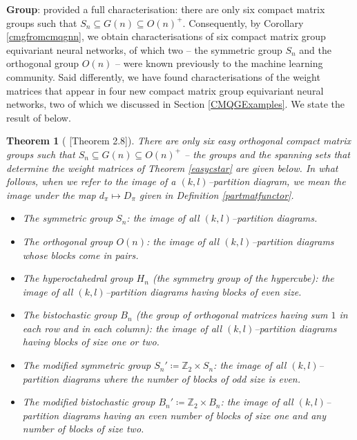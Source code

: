 \documentclass{article}
\theoremstyle{plain}
\newtheorem{theorem}{Theorem}[section]
\theoremstyle{definition}
\theoremstyle{remark}
\begin{document}
\textbf{Group}: 
\citet{banica}
provided a full characterisation: 
there are only six compact matrix groups
such that $S_n \subseteq G(n) \subseteq O(n)^{+}$. 
Consequently, by Corollary \ref{cmgfromcmqgnn},
we obtain characterisations of six compact matrix group equivariant neural networks, of which two -- the symmetric group $S_n$
\citep{ravanbakhsh17a, maron2018, pearcecrump, godfrey}
and the orthogonal group $O(n)$
\citep{pearcecrumpB}
-- 
were known previously to the machine learning community.
Said differently, we have found characterisations of the weight matrices 
that appear in four new compact matrix group equivariant neural networks,
two of which we discussed in Section \ref{CMQGExamples}.
We state the result of \citet{banica} below.

\begin{theorem}[\citet{banica} {[Theorem 2.8]}]
	\label{sixeasyorthog}
There are only six easy orthogonal compact matrix groups 
	such that $S_n \subseteq G(n) \subseteq O(n)^{+}$
	-- 
the groups and the spanning sets that determine the weight matrices of 
Theorem \ref{easycstar}
are given below. In what follows, when we refer to the image of a $(k,l)$--partition diagram, we mean the image under the map $d_\pi \mapsto D_\pi$ given in Definition
\ref{partmatfunctor}.

	\begin{itemize}
\item The symmetric group $S_n$: the image of all $(k,l)$--partition diagrams.

\item The orthogonal group $O(n)$: the image of all $(k,l)$--partition diagrams whose blocks come in pairs.

	\item The hyperoctahedral group $H_n$ (the symmetry group of the hypercube): the image of all $(k,l)$--partition diagrams having blocks of even size.

	\item The bistochastic group $B_n$ (the group of orthogonal matrices having sum $1$ in each row and in each column): the image of all $(k,l)$--partition diagrams having blocks of size one or two.

	\item The modified symmetric group $S_n' \coloneqq \mathbb{Z}_2 \times S_n$: the image of all $(k,l)$--partition diagrams where the number of blocks of odd size is even.

	\item The modified bistochastic group $B_n' \coloneqq \mathbb{Z}_2 \times B_n$: the image of all $(k,l)$--partition diagrams having an even number of blocks of size one and any number of blocks of size two.
	\end{itemize}
\end{theorem}
\end{document}
